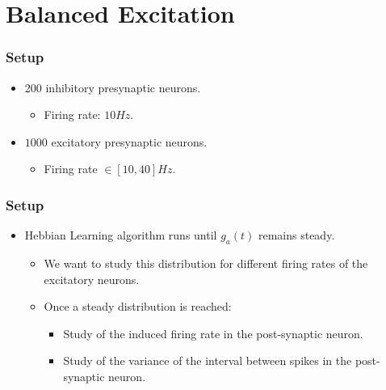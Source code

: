 \documentclass{beamer}
\begin{document}
\section{Balanced Excitation}

	\begin{frame} 
		\frametitle{Setup} 
		\begin{itemize} 	
			\item 200 inhibitory presynaptic neurons. 
			\begin{itemize} 
				\item Firing rate: $10 Hz$. \\
				\hspace{5 mm}
			\end{itemize}
			\item $1000$ excitatory presynaptic neurons. 
			\begin{itemize} 
				\item Firing rate $\in [10,40]Hz$. 
			\end{itemize}
		\end{itemize} 
	\end{frame} 
	\begin{frame}
		\frametitle{Setup} 
		\begin{itemize}
			\item Hebbian Learning algorithm runs until $g_a(t)$ remains steady. 
			\begin{itemize}
				\item We want to study this distribution for different firing rates of the excitatory neurons. \\
				\hspace{5 mm}
				\item Once a steady distribution is reached: 
				\begin{itemize} 
					\item Study of the induced firing rate in the post-synaptic neuron. 
					\item Study of the variance of the interval between spikes in the post-synaptic neuron. 
				\end{itemize}
			\end{itemize}
		\end{itemize}
	\end{frame}
\end{document}
